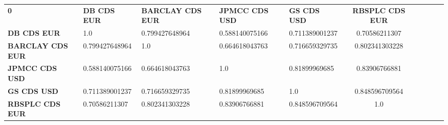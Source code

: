 \begin{center}
 \begin{tabular}{|l|l|l|l|l|c|c|c|c|c|}
\hline
\textbf{0} & \textbf{DB CDS EUR} & \textbf{BARCLAY CDS EUR} & \textbf{JPMCC CDS USD} & \textbf{GS CDS USD} & \textbf{RBSPLC CDS EUR}\\\hhline{|=|=|=|=|=|=|}
\textbf{DB CDS EUR} & 1.0 & 0.799427648964 & 0.588140075166 & 0.711389001237 & 0.70586211307\\
\textbf{BARCLAY CDS EUR} & 0.799427648964 & 1.0 & 0.664618043763 & 0.716659329735 & 0.802341303228\\
\textbf{JPMCC CDS USD} & 0.588140075166 & 0.664618043763 & 1.0 & 0.81899969685 & 0.83906766881\\
\textbf{GS CDS USD} & 0.711389001237 & 0.716659329735 & 0.81899969685 & 1.0 & 0.848596709564\\
\textbf{RBSPLC CDS EUR} & 0.70586211307 & 0.802341303228 & 0.83906766881 & 0.848596709564 & 1.0\\
\hline
\end{tabular}
\end{center}